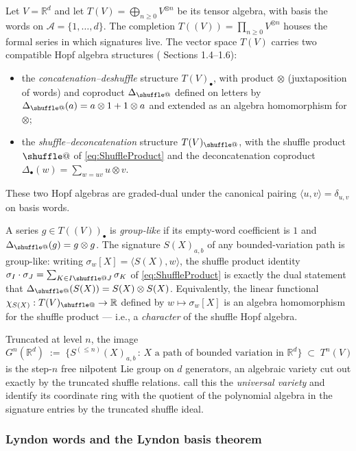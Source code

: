 \documentclass[12pt,english]{article}
\makeatletter
\providecommand*{\shuffle}{\mathbin{\mathpalette\shuffle@{}}}
\newcommand*{\shuffle@}[2]{%
  \sbox0{$#1\vcenter{}$}%
  \kern .15\ht0
  \rlap{\vrule height .25\ht0 depth 0pt width 2.5\ht0}%
  \raise.1\ht0\hbox to 2.5\ht0{%
    \vrule height 1.75\ht0 depth -.1\ht0 width .17\ht0
    \hfill
    \vrule height 1.75\ht0 depth -.1\ht0 width .17\ht0
    \hfill
    \vrule height 1.75\ht0 depth -.1\ht0 width .17\ht0}%
  \kern .15\ht0
}
\theoremstyle{remark}
\makeatother
\begin{document}
Let $V=\mathbb{R}^{d}$ and let $T(V)=\bigoplus_{n\geq0}V^{\otimes n}$
be its tensor algebra, with basis the words on $\mathcal{A}=\{1,\ldots,d\}$.
The completion $T((V))=\prod_{n\geq0}V^{\otimes n}$ houses the formal
series in which signatures live. The vector space $T(V)$ carries
two compatible Hopf algebra structures (\cite{Reutenauer} Sections
1.4--1.6):
\begin{itemize}
\item the \emph{concatenation--deshuffle} structure $T(V)_{\bullet}$,
with product $\otimes$ (juxtaposition of words) and coproduct $\Delta_{\shuffle}$
defined on letters by $\Delta_{\shuffle}(a)=a\otimes1+1\otimes a$
and extended as an algebra homomorphism for $\otimes$;
\item the \emph{shuffle--deconcatenation} structure $T(V)_{\shuffle}$,
with the shuffle product $\shuffle$ of \eqref{eq:ShuffleProduct}
and the deconcatenation coproduct $\Delta_{\bullet}(w)=\sum_{w=uv}u\otimes v$.
\end{itemize}
These two Hopf algebras are graded-dual under the canonical pairing
$\langle u,v\rangle=\delta_{u,v}$ on basis words.

A series $g\in T((V))_{\bullet}$ is \emph{group-like} if its empty-word
coefficient is $1$ and $\Delta_{\shuffle}(g)=g\otimes g$. The signature
$S(X)_{a,b}$ of any bounded-variation path is group-like: writing
$\sigma_{w}[X]=\langle S(X),w\rangle$, the shuffle product identity
$\sigma_{I}\cdot\sigma_{J}=\sum_{K\in I\shuffle J}\sigma_{K}$ of
\eqref{eq:ShuffleProduct} is exactly the dual statement that $\Delta_{\shuffle}(S(X))=S(X)\otimes S(X)$.
Equivalently, the linear functional $\chi_{S(X)}:T(V)_{\shuffle}\to\mathbb{R}$
defined by $w\mapsto\sigma_{w}[X]$ is an algebra homomorphism for
the shuffle product --- i.e., a \emph{character} of the shuffle Hopf
algebra.

Truncated at level $n$, the image
\[
G^{n}(\mathbb{R}^{d})\;:=\;\bigl\{ S^{(\leq n)}(X)_{a,b}\,:\,X\text{ a path of bounded variation in }\mathbb{R}^{d}\bigr\}\;\subset\;T^{n}(V)
\]
is the step-$n$ free nilpotent Lie group on $d$ generators, an algebraic
variety cut out exactly by the truncated shuffle relations. \cite{varieties}
call this the \emph{universal variety} and identify its coordinate
ring with the quotient of the polynomial algebra in the signature
entries by the truncated shuffle ideal.

\subsubsection{Lyndon words and the Lyndon basis theorem}
\end{document}

